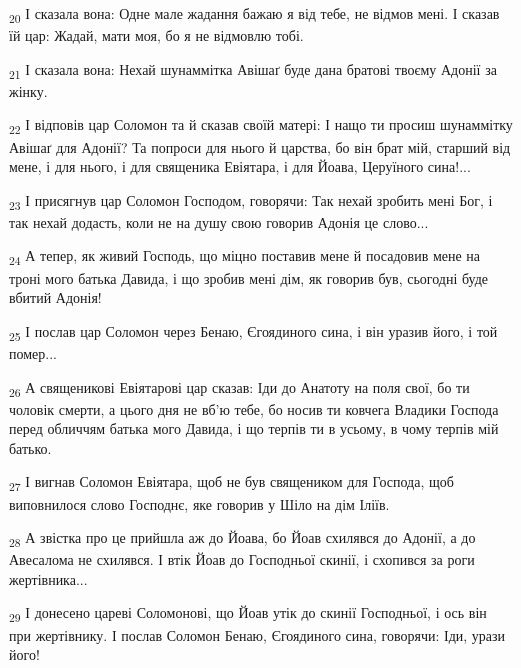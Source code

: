 \begin{tcolorbox}
\textsubscript{20} І сказала вона: Одне мале жадання бажаю я від тебе, не відмов мені. І сказав їй цар: Жадай, мати моя, бо я не відмовлю тобі.
\end{tcolorbox}
\begin{tcolorbox}
\textsubscript{21} І сказала вона: Нехай шунаммітка Авішаґ буде дана братові твоєму Адонії за жінку.
\end{tcolorbox}
\begin{tcolorbox}
\textsubscript{22} І відповів цар Соломон та й сказав своїй матері: І нащо ти просиш шунаммітку Авішаґ для Адонії? Та попроси для нього й царства, бо він брат мій, старший від мене, і для нього, і для священика Евіятара, і для Йоава, Церуїного сина!...
\end{tcolorbox}
\begin{tcolorbox}
\textsubscript{23} І присягнув цар Соломон Господом, говорячи: Так нехай зробить мені Бог, і так нехай додасть, коли не на душу свою говорив Адонія це слово...
\end{tcolorbox}
\begin{tcolorbox}
\textsubscript{24} А тепер, як живий Господь, що міцно поставив мене й посадовив мене на троні мого батька Давида, і що зробив мені дім, як говорив був, сьогодні буде вбитий Адонія!
\end{tcolorbox}
\begin{tcolorbox}
\textsubscript{25} І послав цар Соломон через Бенаю, Єгоядиного сина, і він уразив його, і той помер...
\end{tcolorbox}
\begin{tcolorbox}
\textsubscript{26} А священикові Евіятарові цар сказав: Іди до Анатоту на поля свої, бо ти чоловік смерти, а цього дня не вб'ю тебе, бо носив ти ковчега Владики Господа перед обличчям батька мого Давида, і що терпів ти в усьому, в чому терпів мій батько.
\end{tcolorbox}
\begin{tcolorbox}
\textsubscript{27} І вигнав Соломон Евіятара, щоб не був священиком для Господа, щоб виповнилося слово Господнє, яке говорив у Шіло на дім Іліїв.
\end{tcolorbox}
\begin{tcolorbox}
\textsubscript{28} А звістка про це прийшла аж до Йоава, бо Йоав схилявся до Адонії, а до Авесалома не схилявся. І втік Йоав до Господньої скинії, і схопився за роги жертівника...
\end{tcolorbox}
\begin{tcolorbox}
\textsubscript{29} І донесено цареві Соломонові, що Йоав утік до скинії Господньої, і ось він при жертівнику. І послав Соломон Бенаю, Єгоядиного сина, говорячи: Іди, урази його!
\end{tcolorbox}
